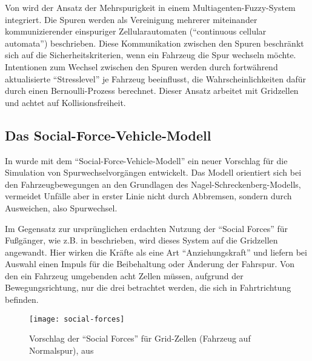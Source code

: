 Von \cite{multi-fuzzy} wird der Ansatz der Mehrspurigkeit in einem Multiagenten-Fuzzy-System integriert.
Die Spuren werden als Vereinigung mehrerer miteinander kommunizierender einspuriger Zellularautomaten (\enquote{continuous cellular automata}) beschrieben. 
Diese Kommunikation zwischen den Spuren beschränkt sich auf die Sicherheitskriterien, wenn ein Fahrzeug die Spur wechseln möchte. 
Intentionen zum Wechsel zwischen den Spuren werden durch fortwährend aktualisierte \enquote{Stresslevel} je Fahrzeug beeinflusst, die Wahrscheinlichkeiten dafür durch einen Bernoulli-Prozess berechnet.
Dieser Ansatz arbeitet mit Gridzellen und achtet auf Kollisionsfreiheit.



\subsection{Das Social-Force-Vehicle-Modell}
\label{sec:social-force-vm}

In \cite{dat-ba} wurde mit dem \enquote{Social-Force-Vehicle-Modell} ein neuer Vorschlag für die Simulation von Spurwechselvorgängen entwickelt. 
Das Modell orientiert sich bei den Fahrzeugbewegungen an den Grundlagen des Nagel-Schreckenberg-Modells, vermeidet Unfälle aber in erster Linie nicht durch Abbremsen, sondern durch Ausweichen, also Spurwechsel. 

Im Gegensatz zur ursprünglichen erdachten Nutzung der \enquote{Social Forces} für Fußgänger, wie z.B. in \cite{soc-for} beschrieben, wird dieses System auf die Gridzellen angewandt. 
Hier wirken die Kräfte als eine Art \enquote{Anziehungskraft} und liefern bei Auswahl einen Impuls für die Beibehaltung oder Änderung der Fahrspur. 
Von den ein Fahrzeug umgebenden acht Zellen müssen, aufgrund der Bewegungsrichtung, nur die drei betrachtet werden, die sich in Fahrtrichtung befinden.

\begin{figure}[hptb]
 \centering
 \texttt{[image: social-forces]}
 \caption[\enquote{Social Forces} für Grid-Zellen]{Vorschlag der \enquote{Social Forces} für Grid-Zellen (Fahrzeug auf Normalspur), aus \cite{dat-ba}}
 \label{figure:social-forces}
\end{figure}
\noindent

